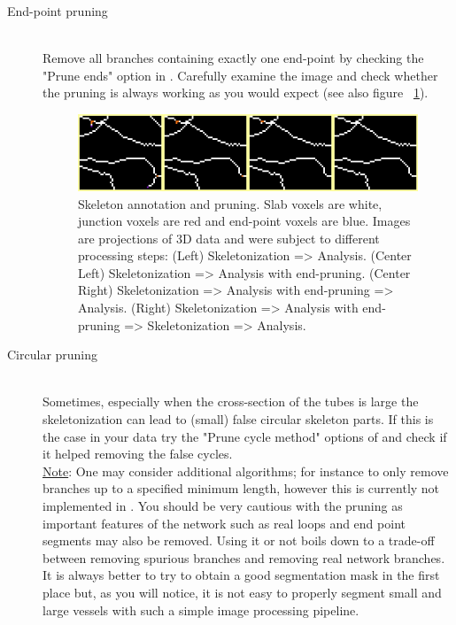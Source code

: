 \begin{description}
%
\item[End-point pruning]\hfill\\
%
Remove all branches containing exactly one end-point by checking the "Prune ends" option in . Carefully examine the image and check whether the pruning is always working as you would expect (see also figure ~\ref{fig:prune}).
\begin{figure}[h!]
  \caption{Skeleton annotation and pruning. Slab voxels are white, junction voxels are red and end-point voxels are blue. Images are projections of 3D data and were subject to different processing steps: (Left) Skeletonization => Analysis. (Center Left) Skeletonization => Analysis with end-pruning. (Center Right) Skeletonization => Analysis with end-pruning => Analysis. (Right) Skeletonization => Analysis with end-pruning => Skeletonization => Analysis.} \label{fig:prune}
  \centering
    \includegraphics[width=1\textwidth]{fig/PruningStack--Montage.jpg}
\end{figure}
%
\item[Circular pruning]\hfill\\
%
Sometimes, especially when the cross-section of the tubes is large the skeletonization can lead to (small) false circular skeleton parts. If this is the case in your data try the "Prune cycle method" options of  and check if it  helped removing the false cycles.\\

\underline{Note}: One may consider additional algorithms; for instance to only remove branches up to a specified minimum length, however this is currently not implemented in . You should be very cautious with the pruning as important features of the network such as real loops and end point segments may also be removed. Using it or not boils down to a trade-off between removing spurious branches and removing real network branches. It is always better to try to obtain a good segmentation mask in the first place but, as you will notice, it is not easy to properly segment small and large vessels with such a simple image processing pipeline.


\end{description}
